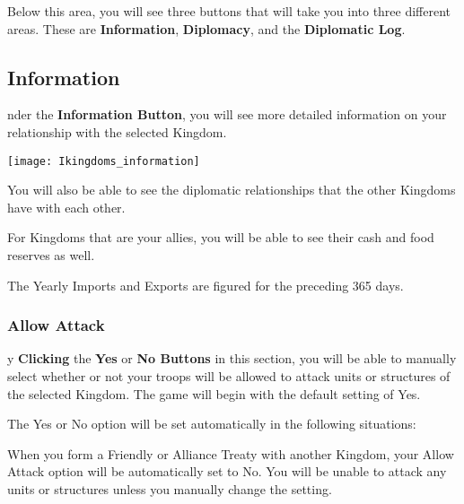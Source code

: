 {Below this area, you will see three buttons that will take you into three different areas. These are \textbf{Information}, \textbf{Diplomacy}, and the \textbf{Diplomatic Log}.

\subsection{\textsf{Information}}


nder the \textbf{Information Button}, you will see more detailed information on your relationship with the selected Kingdom.

\begin{center}
    \texttt{[image: Ikingdoms\_information]} %
\end{center}

You will also be able to see the diplomatic relationships that the other Kingdoms have with each other.

For Kingdoms that are your allies, you will be able to see their cash and food reserves as well.

The Yearly Imports and Exports are figured for the preceding 365 days.

\subsubsection{\textsf{Allow Attack}}



y \textbf{Clicking} the \textbf{Yes} or \textbf{No Buttons} in this section, you will be able to manually select whether or not your troops will be allowed to attack units or structures of the selected Kingdom. The game will begin with the default setting of Yes.

The Yes or No option will be set automatically in the following situations:

\begin{changemargin}{.1cm}{0cm} %

    
When you form a Friendly or Alliance Treaty with another Kingdom, your Allow Attack option will be automatically set to No. You will be unable to attack any units or structures unless you manually change the setting.


\end{changemargin}}
